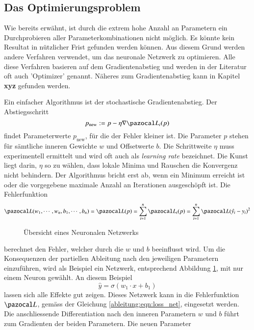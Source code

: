\subsection{Das Optimierungsproblem}
Wie bereits erwähnt, ist durch die extrem hohe Anzahl an Parametern ein Durchprobieren aller Parameterkombinationen nicht möglich.
Es könnte kein Resultat in nützlicher Frist gefunden werden können.
Aus diesem Grund werden andere Verfahren verwendet, um das neuronale Netzwerk zu optimieren.
Alle diese Verfahren basieren auf dem Gradientenabstieg und werden in der Literatur oft auch 'Optimizer' genannt. Näheres zum Gradientenabstieg kann in Kapitel \textbf{xyz} gefunden werden.

Ein einfacher Algorithmus ist der stochastische Gradientenabstieg.
Der Abstiegsschritt 
\begin{equation}
p_{\text{new}}:=p-\eta \nabla \Lb_{i}(p)
\end{equation}
findet Parameterwerte $p_{\text{new}}$, für die der Fehler kleiner ist. Die Parameter $p$ stehen für sämtliche inneren Gewichte $w$ und Offsetwerte $b$. Die Schrittweite $\eta$ muss experimentell ermittelt und wird oft auch als \textit{learning rate} bezeichnet. Die Kunst liegt darin, $\eta$ so zu wählen, dass lokale Minima und Rauschen die Konvergenz nicht behindern. Der Algorithmus bricht erst ab, wenn ein Minimum erreicht ist oder die vorgegebene maximale Anzahl an Iterationen ausgeschöpft ist.
Die Fehlerfunktion
\begin{equation}
\Lb(w_1, \cdots, w_n, b_1, \cdots, b_n) = \Lb(p)=\sum_{i=1}^{n}\Lb_{i}(p)=\sum_{i=1}^{n}\Lb(\hat{y_i}-y_i)^2
\end{equation}
\begin{figure}
	\begin{center}
		
		\caption{Übersicht eines Neuronalen Netzwerks}
		\label{ableitung:fig:single_neuron}
	\end{center}
\end{figure} 
berechnet den Fehler, welcher durch die $w$ und $b$ beeinflusst wird. Um die Konsequenzen der partiellen Ableitung nach den jeweiligen Parametern einzuführen, wird als Beispiel ein Netzwerk, entsprechend Abbildung \ref{ableitung:fig:single_neuron}, mit nur einem Neuron gewählt.
An diesem Beispiel
\begin{equation}
\hat{y} = \sigma \left( w_1 \cdot x + b_1 \right)
\end{equation}
lassen sich alle Effekte gut zeigen.
Dieses Netzwerk kann in die Fehlerfunktion $\Lb$, gemäss der Gleichung \ref{ableitung:eqn:loss_net}, eingesetzt werden. Die anschliessende Differentiation nach den inneren Parametern $w$ und $b$ führt zum Gradienten der beiden Parametern. Die neuen Parameter 
